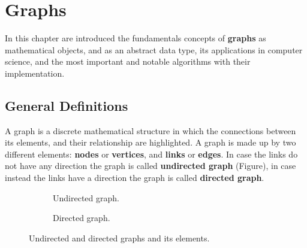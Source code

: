 \chapter{Graphs}
\label{chp:graphs}
In this chapter are introduced the fundamentals concepts of \textbf{graphs} as mathematical objects, and as an abstract data type, its applications in computer science, and the most important and notable algorithms with their implementation. 
 
\section{General Definitions}
A graph is a discrete mathematical structure in which the connections between its elements, and their relationship are highlighted. A graph is made up by two different elements: \textbf{nodes} or \textbf{vertices}, and \textbf{links} or \textbf{edges}. In case the links do not have any direction the graph is called \textbf{undirected graph} (Figure), in case instead the links have a direction the graph is called \textbf{directed graph}.

\begin{figure}[H]
\centering
\begin{subfigure}[b]{0.4\linewidth}
\centering
{}
	\caption{Undirected graph.}
\end{subfigure}
\hspace{1em}
\begin{subfigure}[b]{0.4\linewidth}
\centering
{}
	\caption{Directed graph.}
\end{subfigure}
\caption[Undirected and directed graphs and its elements.]{Undirected and directed graphs and its elements.}
\end{figure}


